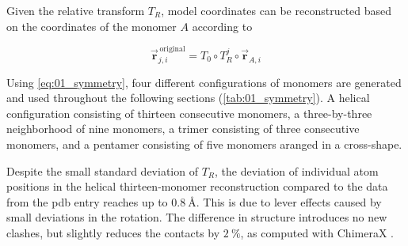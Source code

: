 Given the relative transform $T_R$, model coordinates can be reconstructed based on the coordinates of the monomer $A$ according to 

\begin{equation}\label{eq:01_symmetry}
\vec{\mathbf{r}}_{j,i}^{\,\text{original}} = T_0 \circ T_R^j \circ \vec{\mathbf{r}}_{A,i}
\end{equation}

Using \autoref{eq:01_symmetry}, four different configurations of monomers are generated and used throughout the following sections (\autoref{tab:01_symmetry}). A helical configuration consisting of thirteen consecutive monomers, a three-by-three neighborhood of nine monomers, a trimer consisting of three consecutive monomers, and a pentamer consisting of five monomers aranged in a cross-shape. 

Despite the small standard deviation of $T_R$, the deviation of individual atom positions in the helical thirteen-monomer reconstruction compared to the data from the pdb entry reaches up to $\SI{0.8}{\angstrom}$. This is due to lever effects caused by small deviations in the rotation. The difference in structure introduces no new clashes, but slightly reduces the contacts by $\SI{2}{\percent}$, as computed with ChimeraX \cite{ChimeraX2023}.